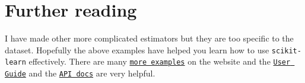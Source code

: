 \documentclass[11pt]{article}
\theoremstyle{definition}
\newcommand{\myhref}[2]{\href{#1}{\texttt{#2}}}
\begin{document}
\section{Further reading}
I have made other more complicated estimators but they are too specific to the dataset. Hopefully the above examples have helped you learn how to use \texttt{scikit-learn} effectively. There are many \myhref{https://scikit-learn.org/stable/auto_examples/index.html}{more examples} on the website and the \myhref{https://scikit-learn.org/stable/user_guide.html}{User Guide} and the \myhref{https://scikit-learn.org/stable/modules/classes.html}{API docs} are very helpful. 
\end{document}
